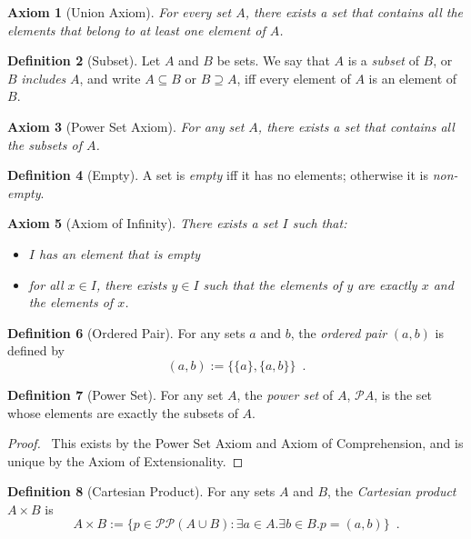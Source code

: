 \documentclass{report}
\let\qed\relax
\newtheorem{ax}{Axiom}[chapter]
\theoremstyle{definition}
\newtheorem{df}[ax]{Definition}
\begin{document}
\begin{ax}[Union Axiom]
For every set $A$, there exists a set that contains all the elements that belong to at least one element of $A$.
\end{ax}

\begin{df}[Subset]
Let $A$ and $B$ be sets. We say that $A$ is a \emph{subset} of $B$, or $B$ \emph{includes} $A$, and write $A \subseteq B$ or $B \supseteq A$, iff every element of $A$ is an element of $B$.
\end{df}

\begin{ax}[Power Set Axiom]
For any set $A$, there exists a set that contains all the subsets of $A$.
\end{ax}

\begin{df}[Empty]
A set is \emph{empty} iff it has no elements; otherwise it is \emph{non-empty}.
\end{df}

\begin{ax}[Axiom of Infinity]
There exists a set $I$ such that:
\begin{itemize}
\item $I$ has an element that is empty
\item for all $x \in I$, there exists $y \in I$ such that the elements of $y$ are exactly $x$ and the elements of $x$.
\end{itemize}
\end{ax}

\begin{df}[Ordered Pair]
For any sets $a$ and $b$, the \emph{ordered pair} $(a,b)$ is defined by
\[ (a,b) := \{ \{ a \}, \{ a, b \} \} \enspace . \]
\end{df}

\begin{df}[Power Set]
For any set $A$, the \emph{power set} of $A$, $\mathcal{P} A$, is the set whose elements are exactly the subsets of $A$.
\end{df}

\begin{proof}
\pf\ This exists by the Power Set Axiom and Axiom of Comprehension, and is unique by the Axiom of Extensionality. \qed
\end{proof}

\begin{df}[Cartesian Product]
For any sets $A$ and $B$, the \emph{Cartesian product} $A \times B$ is
\[ A \times B := \{ p \in \mathcal{P} \mathcal{P} (A \cup B) : \exists a \in A. \exists b \in B. p = (a,b) \} \enspace . \]
\end{df}
\end{document}
